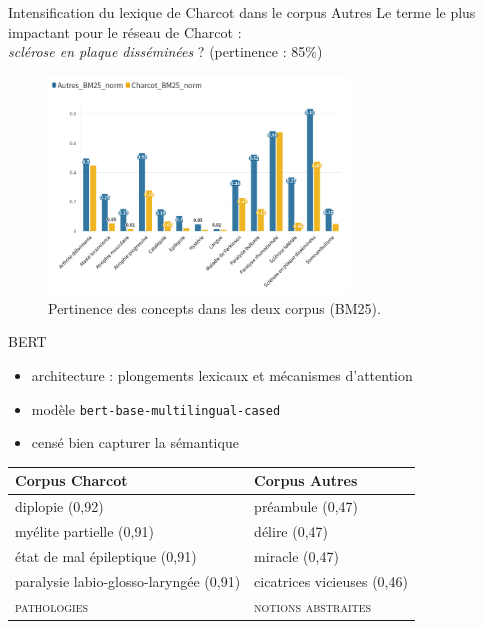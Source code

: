 \begin{frame}{Intensification du lexique
de Charcot dans le corpus \og{}Autres\fg}
Le terme le plus impactant pour le réseau de Charcot :\\ \textit{sclérose en plaque disséminées} ? (pertinence : 85\%)
\begin{figure}[!h]
    \centering
\includegraphics[width=80mm,scale=0.5]{pic/Charcot_Autres_250523.png}
    \caption{Pertinence des concepts dans les deux corpus (BM25).}
    \label{fig:my_label}
\end{figure}
\end{frame}


\begin{frame}{\textsc{BERT}}
\cite{vaswani2021}
    \begin{itemize}
        \item architecture : plongements lexicaux et
mécanismes d’attention
        \item modèle \texttt{bert-base-multilingual-cased}
        \item censé bien capturer la sémantique
    \end{itemize}
\begin{table}[]
\begin{tabular}{ll}
\hline
Corpus \og{}Charcot\fg{}          & Corpus \og{}Autres\fg{} \\
\hline
diplopie (0,92)                & préambule (0,47)  \\
myélite partielle (0,91)       & délire (0,47)     \\
état de mal épileptique (0,91) & miracle (0,47)   \\
paralysie labio-glosso-laryngée (0,91) &
cicatrices vicieuses (0,46) \\
\textsc{pathologies} & \textsc{notions abstraites} \\
\hline 
\end{tabular}
\end{table}
\end{frame}

